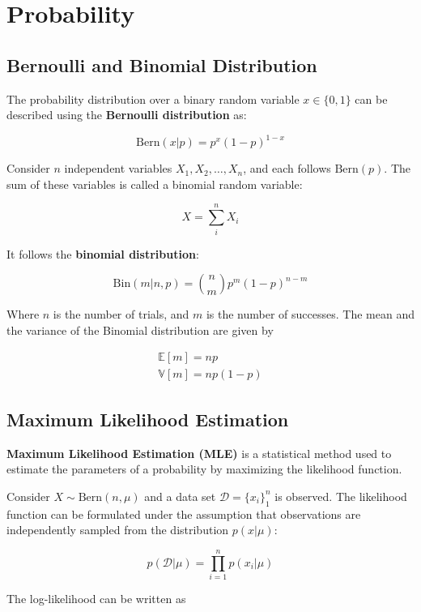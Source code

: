 \section{Probability}
\label{sec:probability}

\subsection{Bernoulli and Binomial Distribution}
\label{subsec:bernoulli-and-binomial-distribution}

The probability distribution over a binary random variable $x \in \{ 0, 1 \}$ can be described using the \textbf{Bernoulli distribution} as:

\[
    \text{Bern}(x | p) = p^x(1-p)^{1-x}
\]

Consider $n$ independent variables $X_1, X_2, \dots, X_n$, and each follows $\text{Bern}(p)$.
The sum of these variables is called a binomial random variable:

\[
    X = \sum_{i}^{n}{X_i}
\]

It follows the \textbf{binomial distribution}:

\[
    \text{Bin}(m | n, p) = {n \choose m} p^m(1 - p)^{n - m}
\]

Where $n$ is the number of trials, and $m$ is the number of successes.
The mean and the variance of the Binomial distribution are given by

\begin{gather*}
    \mathbb{E}[m] = np \\
    \mathbb{V}[m] = np(1 - p)
\end{gather*}

\subsection{Maximum Likelihood Estimation}
\label{subsec:maximum-likelihood-estimation}

\textbf{Maximum Likelihood Estimation (MLE)} is a statistical method used to estimate the parameters of a probability by maximizing the likelihood function.

Consider $X \sim \text{Bern}(n, \mu)$ and a data set $\mathcal{D} = \{ x_i \}_1^n$ is observed.
The likelihood function can be formulated under the assumption that observations are independently sampled from the distribution $p(x | \mu)$:

\[
    p(\mathcal{D} | \mu) = \prod_{i = 1}^{n}{ p(x_i | \mu) }
\]

The log-likelihood can be written as


